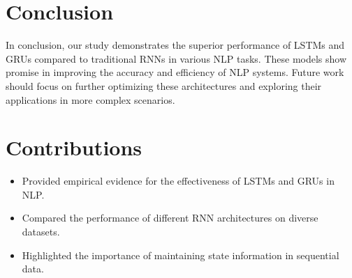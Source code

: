 \documentclass{article}
\begin{document}
\section{Conclusion}
In conclusion, our study demonstrates the superior performance of LSTMs and GRUs compared to traditional RNNs in various NLP tasks. These models show promise in improving the accuracy and efficiency of NLP systems. Future work should focus on further optimizing these architectures and exploring their applications in more complex scenarios.

\section{Contributions}
\begin{itemize}
    \item Provided empirical evidence for the effectiveness of LSTMs and GRUs in NLP.
    \item Compared the performance of different RNN architectures on diverse datasets.
    \item Highlighted the importance of maintaining state information in sequential data.
\end{itemize}



\end{document}
